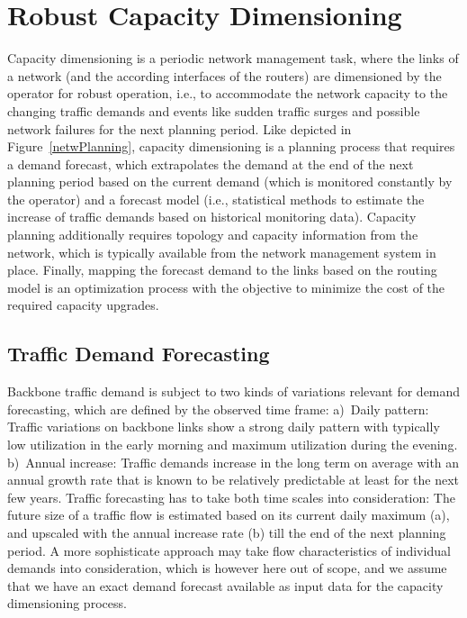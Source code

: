 \documentclass[10pt, conference]{IEEEtran}
\begin{document}
\section{Robust Capacity Dimensioning}\label{math-section}
Capacity dimensioning is a periodic network management task, where the links of a network (and the according interfaces of the routers) are dimensioned by the operator for robust operation, i.e., to accommodate the network capacity to the changing traffic demands and events like sudden traffic surges and possible network failures for the next planning period. Like depicted in Figure~\ref{netwPlanning}, capacity dimensioning is a planning process that requires a demand forecast, which extrapolates the demand at the end of the next planning period based on the current demand (which is monitored constantly by the operator) and a forecast model (i.e., statistical methods to estimate the increase of traffic demands based on historical monitoring data). Capacity planning additionally requires topology and capacity information from the network, which is typically available from the network management system in place. Finally, mapping the forecast demand to the links based on the routing model is an optimization process with the objective to minimize the cost of the required capacity upgrades.

\subsection{Traffic Demand Forecasting}
Backbone traffic demand is subject to two kinds of variations relevant for demand forecasting, which are defined by the observed time frame: a)~Daily pattern: Traffic variations on backbone links show a strong daily pattern with typically low utilization in the early morning and maximum utilization during the evening. b)~Annual increase: Traffic demands increase in the long term on average with an annual growth rate that is known to be relatively predictable at least for the next few years. Traffic forecasting has to take both time scales into consideration: The future size of a traffic flow is estimated based on its current daily maximum (a), and upscaled with the annual increase rate (b) till the end of the next planning period. A more sophisticate approach may take flow characteristics of individual demands into consideration, which is however here out of scope, and we assume that we have an exact demand forecast available as input data for the capacity dimensioning process.
\end{document}
